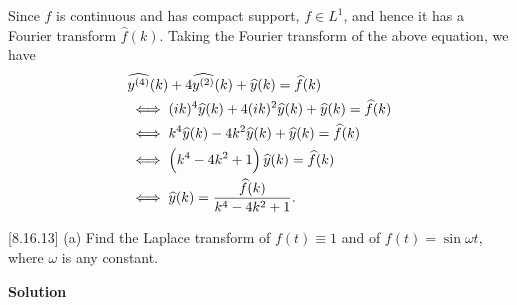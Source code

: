 \documentclass{article}
\begin{document}
Since $f$ is continuous and has compact support, $f \in L^1$, and hence
it has a Fourier transform $\widehat{f}(k)$. Taking the Fourier
transform of the above equation, we have
%
\begin{align*}
    &\widehat{y^{(4)}}(k) + 4 \widehat{y^{(2)}}(k) + \widehat{y}(k) = \widehat{f}(k) \\
    &\iff (i k)^4 \widehat{y}(k) + 4 (i k)^2 \widehat{y}(k) + \widehat{y}(k) = \widehat{f}(k) \\
    &\iff k^4 \widehat{y}(k) - 4 k^2 \widehat{y}(k) + \widehat{y}(k) = \widehat{f}(k) \\
    &\iff \del{k^4 - 4 k^2 + 1} \widehat{y}(k) = \widehat{f}(k) \\
    &\iff \widehat{y}(k) = \frac{\widehat{f}(k)}{k^4 - 4 k^2 + 1}
    .
\end{align*}
%

\vspace{5mm}

[8.16.13] (a) Find the Laplace transform of $f(t) \equiv 1$ and of
$f(t) = \sin \omega t$, where $\omega$ is any constant.

\textbf{Solution}
\end{document}
